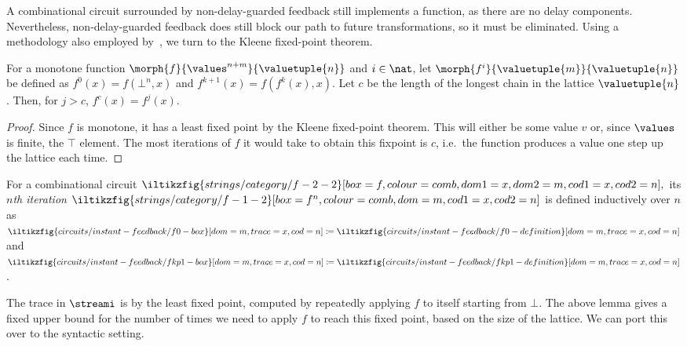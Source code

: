 A combinational circuit surrounded by non-delay-guarded feedback still
implements a function, as there are no delay components.
Nevertheless, non-delay-guarded feedback does still block our path to future
transformations, so it must be eliminated.
Using a methodology also employed by~\cite{riedel2012cyclic}, we turn to the
Kleene fixed-point theorem.

\begin{lemma}\label{lem:monotone-fixpoint}
    For a monotone function \(\morph{f}{\values^{n+m}}{\valuetuple{n}}\) and
    \(i \in \nat\), let \(\morph{f^i}{\valuetuple{m}}{\valuetuple{n}}\) be
    defined as \(f^0(x)  = f(\bot^n,x)\) and \(f^{k+1}(x) = f(f^k(x), x)\).
    Let \(c\) be the length of the longest chain in the lattice
    \(\valuetuple{n}\).
    Then, for \(j > c\), \(f^c(x) = f^{j}(x)\).
\end{lemma}
\begin{proof}
    Since \(f\) is monotone, it has a least fixed point by the Kleene
    fixed-point theorem.
    This will either be some value \(v\) or, since \(\values\) is finite, the
    \(\top\) element.
    The most iterations of \(f\) it would take to obtain this fixpoint is \(c\),
    i.e.\ the function produces a value one step up the lattice each time.
\end{proof}

\begin{definition}[Iteration]\label{def:iteration}
    For a combinational circuit \(
        \iltikzfig{strings/category/f-2-2}[box=f,colour=comb,dom1=x,dom2=m,cod1=x,cod2=n],
    \)
    its \emph{\(n\)th iteration} \(
        \iltikzfig{strings/category/f-1-2}[box=f^n,colour=comb,dom=m,cod1=x,cod2=n]
    \) is defined inductively over \(n\) as \(
        \iltikzfig{circuits/instant-feedback/f0-box}[dom=m,trace=x,cod=n]
        \coloneqq
        \iltikzfig{circuits/instant-feedback/f0-definition}[dom=m,trace=x,cod=n]
    \) and \(
        \iltikzfig{circuits/instant-feedback/fkp1-box}[dom=m,trace=x,cod=n]
        \coloneqq
        \iltikzfig{circuits/instant-feedback/fkp1-definition}[dom=m,trace=x,cod=n]
    \).
\end{definition}

The trace in \(\streami\) is by the least fixed point, computed by repeatedly
applying \(f\) to itself starting from \(\bot\).
The above lemma gives a fixed upper bound for the number of times we need to
apply \(f\) to reach this fixed point, based on the size of the lattice.
We can port this over to the syntactic setting.

